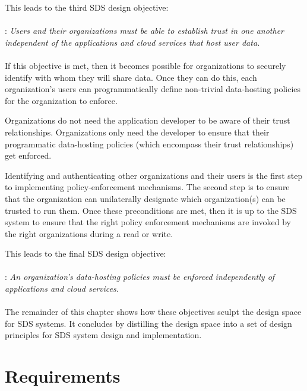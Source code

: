 This leads to the third SDS design objective:
\\
\\
: \emph{Users and their organizations
must be able to establish trust in one another independent of the
applications and cloud services that host user data.}
\\
\\
If this objective is met, then it becomes possible for organizations to
securely identify with whom they will share data.  Once they can do this,
each organization's users can programmatically define non-trivial data-hosting policies
for the organization to enforce.

Organizations do not need the application developer to be aware
of their trust relationships.  Organizations only need the developer to
ensure that their programmatic data-hosting policies (which encompass their trust
relationships) get enforced.

Identifying and authenticating other organizations and their users
is the first step to implementing policy-enforcement mechanisms.
The second step is to ensure that the organization can unilaterally
designate which organization(s) can be trusted to run them.
Once these preconditions are met, then it is up to the SDS system to ensure that the right
policy enforcement mechanisms are invoked by the right organizations during a read or write.

This leads to the final SDS design objective:
\\
\\
: \emph{An organization's data-hosting policies
must be enforced independently of applications and cloud services.}
\\
\\
The remainder of this chapter shows how these objectives sculpt the design space
for SDS systems.  It concludes by distilling the design space into a set of
design principles for SDS system design and implementation.

\section{Requirements}

